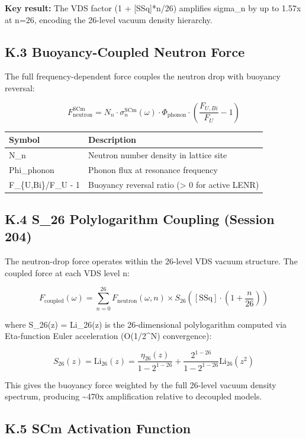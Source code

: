 \documentclass[11pt]{article}
\begin{document}
\textbf{Key result:} The VDS factor (1 + [SSq]*n/26) amplifies sigma\_n by up to 1.57x at n=26, encoding the 26-level vacuum density hierarchy.

\subsection*{K.3 Buoyancy-Coupled Neutron Force}

The full frequency-dependent force couples the neutron drop with buoyancy reversal:

$$F_{\mathrm{neutron}}^{\mathrm{SCm}} = N_n \cdot \sigma_n^{\mathrm{SCm}}(\omega) \cdot \Phi_{\mathrm{phonon}} \cdot \left(\frac{F_{U,Bi}}{F_U} - 1\right)$$

\begin{center}
\begin{longtable}{ll}
\toprule
Symbol & Description \tabularnewline
\midrule
\endhead
N\_n & Neutron number density in lattice site \tabularnewline
Phi\_phonon & Phonon flux at resonance frequency \tabularnewline
F\_\{U,Bi\}/F\_U - 1 & Buoyancy reversal ratio (> 0 for active LENR) \tabularnewline
\bottomrule
\end{longtable}
\end{center}

\subsection*{K.4 S\_26 Polylogarithm Coupling (Session 204)}

The neutron-drop force operates within the 26-level VDS vacuum structure. The coupled force at each VDS level n:

$$F_{\mathrm{coupled}}(\omega) = \sum_{n=0}^{26} F_{\mathrm{neutron}}(\omega, n) \times S_{26}\!\left([\text{SSq}] \cdot \left(1 + \frac{n}{26}\right)\right)$$

where S\_26(z) = Li\_26(z) is the 26-dimensional polylogarithm computed via Eta-function Euler acceleration (O(1/2\textasciicircum{}N) convergence):

$$S_{26}(z) = \text{Li}_{26}(z) = \frac{\eta_{26}(z)}{1 - 2^{1-26}} + \frac{2^{1-26}}{1 - 2^{1-26}} \text{Li}_{26}(z^2)$$

This gives the buoyancy force weighted by the full 26-level vacuum density spectrum, producing \textasciitilde{}470x amplification relative to decoupled models.

\subsection*{K.5 SCm Activation Function}
\end{document}
